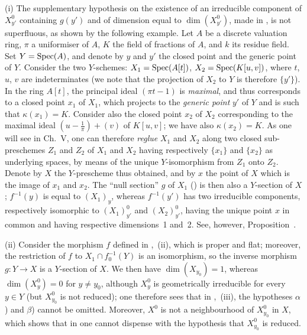 \begin{remarks}[15.6.10]
\label{IV.15.6.10}
(i)
The supplementary hypothesis on the existence of an irreducible component of $X_{y'}^0$ containing $g(y')$ and of dimension equal to $\dim(X_{y'}^0)$, made in , is not superfluous, as shown by the following example.
Let $A$ be a discrete valuation ring, $\pi$ a uniformiser of $A$, $K$ the field of fractions of $A$, and $k$ its residue field. Set $Y=\operatorname{Spec}(A)$, and denote by $y$ and $y'$ the closed point and the generic point of $Y$.
Consider the two $Y$-schemes: $X_1=\operatorname{Spec}(A[t])$, $X_2=\operatorname{Spec}(K[u,v])$, where $t$, $u$, $v$ are indeterminates (we note that the projection of $X_2$ to $Y$ is therefore $\{y'\}$).
In the ring $A[t]$, the principal ideal $(\pi t-1)$ is \emph{maximal}, and thus corresponds to a closed point $x_1$ of $X_1$, which projects to the \emph{generic point} $y'$ of $Y$ and is such that $\kappa(x_1)=K$.
Consider also the closed point $x_2$ of $X_2$ corresponding to the maximal ideal $\left(u-\frac{1}{\pi}\right)+(v)$ of $K[u,v]$; we have also $\kappa(x_2)=K$.
As one will see in Ch.\ V, one can therefore \emph{reglue} $X_1$ and $X_2$ along two closed sub-preschemes $Z_1$ and $Z_2$ of $X_1$ and $X_2$ having respectively $\{x_1\}$ and $\{x_2\}$ as underlying spaces, by means of the unique $Y$-isomorphism from $Z_1$ onto $Z_2$.
Denote by $X$ the $Y$-prescheme thus obtained, and by $x$ the point of $X$ which is the image of $x_1$ and $x_2$.
The ``null section'' $g$ of $X_1$ () is then also a $Y$-section of $X$; $f^{-1}(y)$ is equal to $(X_1)_y$, whereas $f^{-1}(y')$ has two irreducible components, respectively isomorphic to $(X_1)_{y'}^0$ and $(X_2)_{y'}^0$, having the unique point $x$ in common and having respective dimensions~1 and~2. See, however, Proposition~.

(ii)
Consider the morphism $f$ defined in ,~(ii), which is proper and flat; moreover, the restriction of $f$ to $X_1\cap f_0^{-1}(Y)$ is an isomorphism, so the inverse morphism $g:Y\to X$ is a $Y$-section of $X$.
We then have $\dim(X_{y_0})=1$, whereas $\dim(X_y^0)=0$ for $y\neq y_0$, although $X_y^0$ is geometrically irreducible for every $y\in Y$ (but $X_{y_0}^0$ is not reduced); one therefore sees that in ,~(iii), the hypotheses $\alpha$) and $\beta$) cannot be omitted.
Moreover, $X^0$ is not a neighbourhood of $X_{y_0}^0$ in $X$, which shows that in  one cannot dispense with the hypothesis that $X_{y_0}^0$ is reduced.


\end{remarks}
